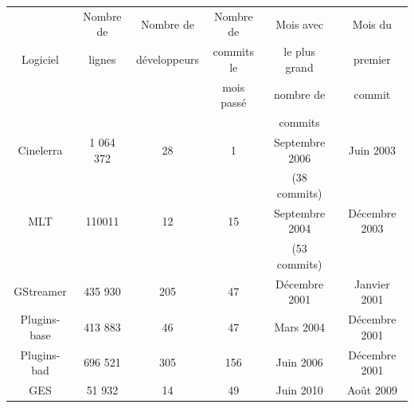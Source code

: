\begin{center}

  \begin{tabular}{ | c | c | c | c |c| c |}

    \hline

         &Nombre de& Nombre de & Nombre de&Mois avec& Mois du \\

Logiciel &lignes & développeurs& commits le&le plus grand & premier\\

         &&&mois passé&nombre de&commit\\

         &&&&commits&\\

\hline \hline

Cinelerra&1 064 372 &28&1& Septembre 2006&Juin 2003\\

&&&&(38 commits)&\\ \hline

MLT\index{MLT}& 110011 &12&15& Septembre 2004&Décembre 2003\\

&&&&(53 commits)& \\ \hline

GStreamer& 435 930  &205&47& Décembre 2001&Janvier 2001\\

Plugins-base& 413 883 &46&47& Mars 2004&Décembre 2001\\

Plugins-bad& 696 521 &305&156& Juin 2006&Décembre 2001\\

GES& 51 932 &14&49& Juin 2010&Août 2009\\

\hline

  \end{tabular}

\end{center}

\paragraph{ }

